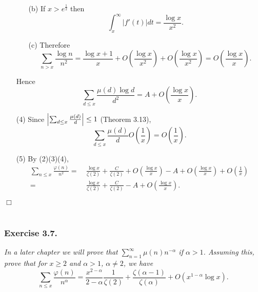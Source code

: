 \documentclass{article}
\begin{document}
\begin{enumerate}
\begin{enumerate}
  \item[(b)]
    If $x > e^{\frac{1}{2}}$ then
    \[
      \int_{x}^{\infty} |f'(t)| dt = \frac{\log x}{x^2}.
    \]
    
  \item[(c)]
    Therefore
    \[
      \sum_{n > x} \frac{\log n}{n^2}
      = \frac{\log x + 1}{x}
          + O\left( \frac{\log x}{x^2} \right)
          + O\left( \frac{\log x}{x^2} \right)
      = O\left( \frac{\log x}{x} \right).
    \]
  \end{enumerate}
  Hence
  \[
    \sum_{d \leq x} \frac{\mu(d) \log d}{d^2} = A + O\left( \frac{\log x}{x} \right).
  \]

\item[(4)]
  Since $\abs{\sum_{d \leq x} \frac{\mu(d)}{d}} \leq 1$ (Theorem 3.13),
  \[
    \sum_{d \leq x} \frac{\mu(d)}{d} O\left(\frac{1}{x}\right)
    = O\left(\frac{1}{x}\right).
  \]

\item[(5)]
  By (2)(3)(4),
  \begin{align*}
    \sum_{n \leq x} \frac{\varphi(n)}{n^2}
    =& \: \frac{\log x}{\zeta(2)} + \frac{C}{\zeta(2)}
        + O\left( \frac{\log x}{x} \right)
        - A + O\left( \frac{\log x}{x} \right)
        + O\left(\frac{1}{x}\right) \\
    =& \: \frac{\log x}{\zeta(2)} + \frac{C}{\zeta(2)} - A + O\left( \frac{\log x}{x} \right).
  \end{align*}
\end{enumerate}
$\Box$ \\\\






\subsubsection*{Exercise 3.7.}
\emph{In a later chapter we will prove that $\sum_{n=1}^{\infty} \mu(n) n^{-\alpha}$ if $\alpha > 1$.
Assuming this, prove that for $x \geq 2$ and $\alpha > 1$, $\alpha \neq 2$, we have}
\[
  \sum_{n \leq x} \frac{\varphi(n)}{n^{\alpha}}
  = \frac{x^{2 - \alpha}}{2 - \alpha}\frac{1}{\zeta(2)}
      + \frac{\zeta(\alpha-1)}{\zeta(\alpha)} + O(x^{1-\alpha} \log x).
\] \\
\end{document}
